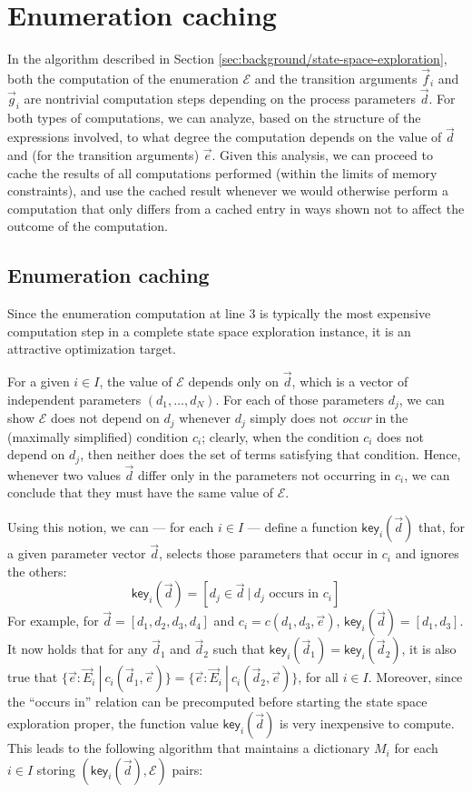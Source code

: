 \documentclass[a4paper]{article}
\begin{document}
\section{Enumeration caching}
\label{sec:enumeration-caching}
In the algorithm described in Section \ref{sec:background/state-space-exploration}, both the computation of the enumeration $\mathcal{E}$ and the transition arguments $\vec{f}_i$ and $\vec{g}_i$ are nontrivial computation steps depending on the process parameters $\vec{d}$. For both types of computations, we can analyze, based on the structure of the expressions involved, to what degree the computation depends on the value of $\vec{d}$ and (for the transition arguments) $\vec{e}$. Given this analysis, we can proceed to cache the results of all computations performed (within the limits of memory constraints), and use the cached result whenever we would otherwise perform a computation that only differs from a cached entry in ways shown not to affect the outcome of the computation.

\subsection{Enumeration caching}
\label{sec:enumeration-caching/enumeration-caching}
Since the enumeration computation at line 3 is typically the most expensive computation step in a complete state space exploration instance, it is an attractive optimization target.

For a given $i \in I$, the value of $\mathcal{E}$ depends only on $\vec{d}$, which is a vector of independent parameters $(d_1, \ldots, d_N)$. For each of those parameters $d_j$, we can show $\mathcal{E}$ does not depend on $d_j$ whenever $d_j$ simply does not \textit{occur} in the (maximally simplified) condition $c_i$; clearly, when the condition $c_i$ does not depend on $d_j$, then neither does the set of terms satisfying that condition. Hence, whenever two values $\vec{d}$ differ only in the parameters not occurring in $c_i$, we can conclude that they must have the same value of $\mathcal{E}$.

Using this notion, we can --- for each $i \in I$ --- define a function $\textsf{key}_i(\vec{d})$ that, for a given parameter vector $\vec{d}$, selects those parameters that occur in $c_i$ and ignores the others:
$$ \textsf{key}_i(\vec{d}) = \left[ d_j \in \vec{d} ~|~ d_j \textrm{ occurs in } c_i \right] $$
For example, for $\vec{d} = [d_1, d_2, d_3, d_4]$ and $c_i = c(d_1, d_3, \vec{e})$, $\textsf{key}_i(\vec{d}) = [d_1, d_3]$. It now holds that for any $\vec{d}_1$ and $\vec{d}_2$ such that $\textsf{key}_i(\vec{d}_1) = \textsf{key}_i(\vec{d}_2)$, it is also true that $\{\vec{e} : \vec{E}_i ~|~ c_i(\vec{d}_1, \vec{e})\} = \{\vec{e} : \vec{E}_i ~|~ c_i(\vec{d}_2, \vec{e})\}$, for all $i \in I$. Moreover, since the ``occurs in'' relation can be precomputed before starting the state space exploration proper, the function value $\textsf{key}_i(\vec{d})$ is very inexpensive to compute. This leads to the following algorithm that maintains a dictionary $M_i$ for each $i \in I$ storing $(\textsf{key}_i(\vec{d}), \mathcal{E})$ pairs:
\end{document}
